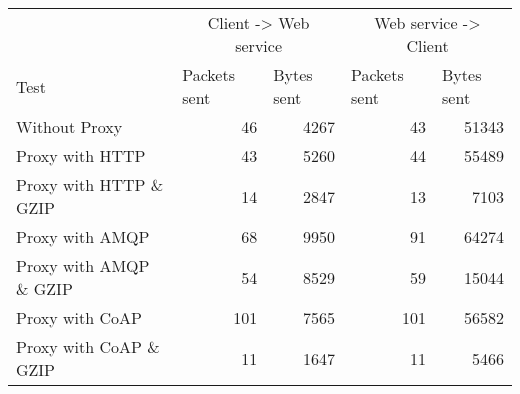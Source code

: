 \begin{tabular}{lrrrr}
\hline
\multicolumn{1}{l}{}                  & \multicolumn{2}{c}{Client -> Web service}                           & \multicolumn{2}{c}{Web service -> Client}                           \\
\multicolumn{1}{l}{Test} & \multicolumn{1}{l}{Packets sent} & \multicolumn{1}{l}{Bytes sent} & \multicolumn{1}{l}{Packets sent} & \multicolumn{1}{l}{Bytes sent} \\ \hline
Without Proxy                   & 46             & 4267           & 43             & 51343          \\
Proxy with HTTP                 & 43             & 5260           & 44             & 55489          \\
Proxy with HTTP \& GZIP         & 14             & 2847           & 13             & 7103           \\
Proxy with AMQP                 & 68             & 9950           & 91             & 64274          \\
Proxy with AMQP \& GZIP         & 54             & 8529           & 59             & 15044          \\
Proxy with CoAP                 & 101            & 7565           & 101            & 56582          \\
Proxy with CoAP \& GZIP         & 11             & 1647           & 11             & 5466           \\
\end{tabular}
